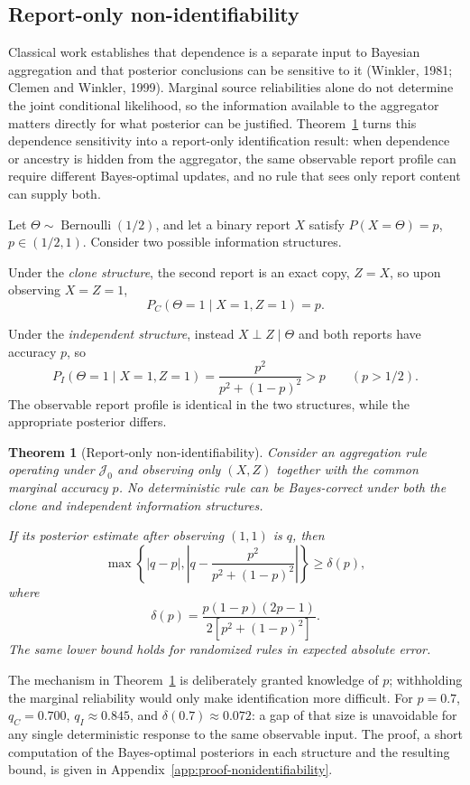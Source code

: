 \documentclass[11pt]{article}
\newtheorem{theorem}{Theorem}
\theoremstyle{definition}
\begin{document}
\subsection{Report-only non-identifiability}
\label{sec:non-identifiability}

Classical work establishes that dependence is a separate input to Bayesian aggregation and that posterior conclusions can be sensitive to it (Winkler, 1981; Clemen and Winkler, 1999). Marginal source reliabilities alone do not determine the joint conditional likelihood, so the information available to the aggregator matters directly for what posterior can be justified. Theorem~\ref{thm:non-identifiability} turns this dependence sensitivity into a report-only identification result: when dependence or ancestry is hidden from the aggregator, the same observable report profile can require different Bayes-optimal updates, and no rule that sees only report content can supply both.

Let $\Theta\sim\operatorname{Bernoulli}(1/2)$, and let a binary report $X$ satisfy $P(X=\Theta)=p$, $p\in(1/2,1)$. Consider two possible information structures.

Under the \emph{clone structure}, the second report is an exact copy, $Z=X$, so upon observing $X=Z=1$,
\[
P_C(\Theta=1\mid X=1,Z=1)=p.
\]

Under the \emph{independent structure}, instead $X\perp Z\mid\Theta$ and both reports have accuracy $p$, so
\[
P_I(\Theta=1\mid X=1,Z=1)
=
\frac{p^2}{p^2+(1-p)^2}
>p
\qquad(p>1/2).
\]
The observable report profile is identical in the two structures, while the appropriate posterior differs.

\begin{theorem}[Report-only non-identifiability]
\label{thm:non-identifiability}
Consider an aggregation rule operating under $\mathcal J_0$ and observing only $(X,Z)$ together with the common marginal accuracy $p$. No deterministic rule can be Bayes-correct under both the clone and independent information structures.

If its posterior estimate after observing $(1,1)$ is $q$, then
\[
\max\left\{
|q-p|,
\left|
q-\frac{p^2}{p^2+(1-p)^2}
\right|
\right\}
\geq
\delta(p),
\]
where
\[
\delta(p)
=
\frac{p(1-p)(2p-1)}
{2[p^2+(1-p)^2]}.
\]
The same lower bound holds for randomized rules in expected absolute error.
\end{theorem}

The mechanism in Theorem~\ref{thm:non-identifiability} is deliberately granted knowledge of $p$; withholding the marginal reliability would only make identification more difficult. For $p=0.7$, $q_C=0.700$, $q_I\approx0.845$, and $\delta(0.7)\approx0.072$: a gap of that size is unavoidable for any single deterministic response to the same observable input. The proof, a short computation of the Bayes-optimal posteriors in each structure and the resulting bound, is given in Appendix~\ref{app:proof-nonidentifiability}.
\end{document}
